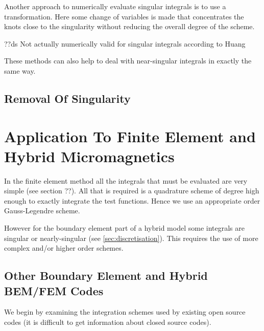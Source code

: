 Another approach to numerically evaluate singular integrals is to use a transformation. Here some change of variables is made that concentrates the knots close to the singularity without reducing the overall degree of the scheme.

??ds Not actually numerically valid for singular integrals according to Huang \cite{Huang1993}






These methods can also help to deal with near-singular integrals in exactly the same way.

\subsection{Removal Of Singularity}




\section{Application To Finite Element and Hybrid Micromagnetics}

In the finite element method all the integrals that must be evaluated are very simple (see section ??). All that is required is a quadrature scheme of degree high enough to exactly integrate the test functions. Hence we use an appropriate order Gauss-Legendre scheme.

However for the boundary element part of a hybrid model some integrals are singular or nearly-singular (see \cref{sec:discretisation}). This requires the use of more complex and/or higher order schemes.

\subsection{Other Boundary Element and Hybrid BEM/FEM Codes}

We begin by examining the integration schemes used by existing open source codes (it is difficult to get information about closed source codes).

